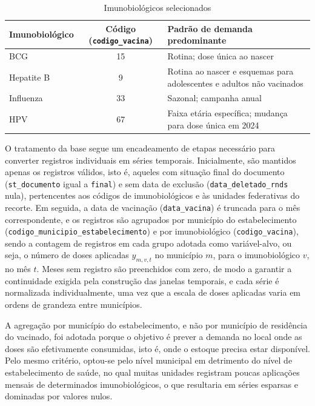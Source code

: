 \documentclass[
    12pt,                %
    openright,           %
    oneside,             %
    a4paper,             %
    english,             %
    brazil               %
]{abntex2}
\begin{document}
\begin{table}[htb]
    \centering
    \caption{Imunobiológicos selecionados}
    \label{tab:imunobiologicos}
    \begin{tabularx}{\textwidth}{l|c|>{\raggedright\arraybackslash}X}
        \toprule
        \textbf{Imunobiológico} & \textbf{Código (\texttt{codigo\_vacina})} & \textbf{Padrão de demanda predominante} \\
        \midrule
        BCG & 15 & Rotina; dose única ao nascer \\
        Hepatite B & 9 & Rotina ao nascer e esquemas para adolescentes e adultos não vacinados \\
        Influenza & 33 & Sazonal; campanha anual \\
        HPV & 67 & Faixa etária específica; mudança para dose única em 2024 \\
        \bottomrule
    \end{tabularx}
\end{table}

O tratamento da base segue um encadeamento de etapas necessário para converter registros individuais em séries temporais. Inicialmente, são mantidos apenas os registros válidos, isto é, aqueles com situação final do documento (\texttt{st\_documento} igual a \texttt{final}) e sem data de exclusão (\texttt{data\_deletado\_rnds} nula), pertencentes aos códigos de imunobiológicos e às unidades federativas do recorte. Em seguida, a data de vacinação (\texttt{data\_vacina}) é truncada para o mês correspondente, e os registros são agrupados por município do estabelecimento (\texttt{codigo\_municipio\_estabelecimento}) e por imunobiológico (\texttt{codigo\_vacina}), sendo a contagem de registros em cada grupo adotada como variável-alvo, ou seja, o número de doses aplicadas $y_{m,v,t}$ no município $m$, para o imunobiológico $v$, no mês $t$. Meses sem registro são preenchidos com zero, de modo a garantir a continuidade exigida pela construção das janelas temporais, e cada série é normalizada individualmente, uma vez que a escala de doses aplicadas varia em ordens de grandeza entre municípios.

A agregação por município do estabelecimento, e não por município de residência do vacinado, foi adotada porque o objetivo é prever a demanda no local onde as doses são efetivamente consumidas, isto é, onde o estoque precisa estar disponível. Pelo mesmo critério, optou-se pelo nível municipal em detrimento do nível de estabelecimento de saúde, no qual muitas unidades registram poucas aplicações mensais de determinados imunobiológicos, o que resultaria em séries esparsas e dominadas por valores nulos.
\end{document}
